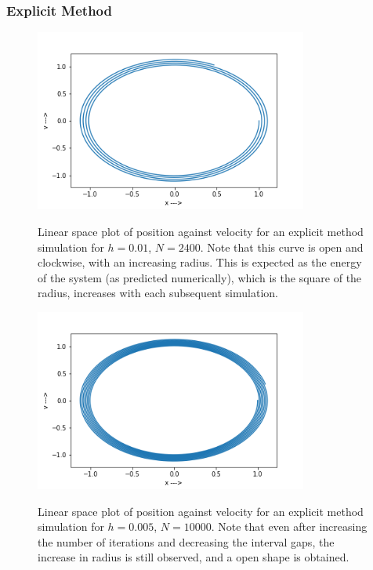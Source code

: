 \documentclass{report}
\begin{document}
\subsubsection*{Explicit Method}
\begin{figure}[H]
	\centering
	\includegraphics[width = 0.8\textwidth]{phaseE.png}
	\label{pE1}
	\caption{Linear space plot of position against velocity for an explicit method simulation for $h=0.01$, $N=2400$. Note that this curve is open and clockwise, with an increasing radius. This is expected as the energy of the system (as predicted numerically), which is the square of the radius, increases with each subsequent simulation.}
\end{figure}
\begin{figure}[H]
	\centering
	\includegraphics[width = 0.8\textwidth]{phaseE2.png}
	\label{pE2}
	\caption{Linear space plot of position against velocity for an explicit method simulation for $h=0.005$, $N=10000$. Note that even after increasing the number of iterations and decreasing the interval gaps, the increase in radius is still observed, and a open shape is obtained.}
\end{figure}
\end{document}
